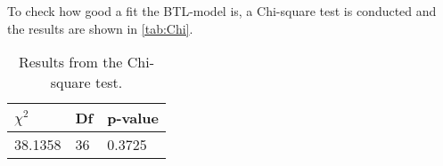\noindent 
%
To check how good a fit the BTL-model is, a Chi-square test is conducted and the results are shown in \autoref{tab:Chi}. 
%
\begin{table}[H]
\centering
\begin{tabular}{@{}lll@{}}
\toprule
$\chi^{2}$     & Df & p-value \\ \midrule
38.1358      & 36  &  0.3725   \\ \bottomrule
\end{tabular}
\caption{Results from the Chi-square test.}
\label{tab:Chi}
\end{table} 
\vfill